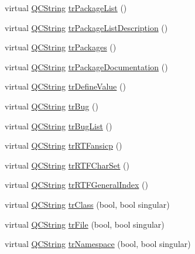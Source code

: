 \begin{DoxyCompactItemize}
\item 
virtual \mbox{\hyperlink{class_q_c_string}{Q\+C\+String}} \mbox{\hyperlink{class_translator_arabic_a265f6f48fad089ea092ab98682e0d842}{tr\+Package\+List}} ()
\item 
virtual \mbox{\hyperlink{class_q_c_string}{Q\+C\+String}} \mbox{\hyperlink{class_translator_arabic_ab1192d198f1a4bd72319034848f9bb08}{tr\+Package\+List\+Description}} ()
\item 
virtual \mbox{\hyperlink{class_q_c_string}{Q\+C\+String}} \mbox{\hyperlink{class_translator_arabic_a072aa43f25aa0fbff418fcc8a777e769}{tr\+Packages}} ()
\item 
virtual \mbox{\hyperlink{class_q_c_string}{Q\+C\+String}} \mbox{\hyperlink{class_translator_arabic_a06b71185bea0e8511121b5274d5e45be}{tr\+Package\+Documentation}} ()
\item 
virtual \mbox{\hyperlink{class_q_c_string}{Q\+C\+String}} \mbox{\hyperlink{class_translator_arabic_a69d32547d8c7f9c08fdd5414adb2af57}{tr\+Define\+Value}} ()
\item 
virtual \mbox{\hyperlink{class_q_c_string}{Q\+C\+String}} \mbox{\hyperlink{class_translator_arabic_aacd74b628e36340a3b593435bc295529}{tr\+Bug}} ()
\item 
virtual \mbox{\hyperlink{class_q_c_string}{Q\+C\+String}} \mbox{\hyperlink{class_translator_arabic_a1a0f397c655873ff36805aef2a2f4282}{tr\+Bug\+List}} ()
\item 
virtual \mbox{\hyperlink{class_q_c_string}{Q\+C\+String}} \mbox{\hyperlink{class_translator_arabic_aa85b5114f22f96945211a76b143bc067}{tr\+R\+T\+Fansicp}} ()
\item 
virtual \mbox{\hyperlink{class_q_c_string}{Q\+C\+String}} \mbox{\hyperlink{class_translator_arabic_a2d31627bc9d5ab47da2d88e210a17b32}{tr\+R\+T\+F\+Char\+Set}} ()
\item 
virtual \mbox{\hyperlink{class_q_c_string}{Q\+C\+String}} \mbox{\hyperlink{class_translator_arabic_ab7697710fd8381e9b2439afb69fb1894}{tr\+R\+T\+F\+General\+Index}} ()
\item 
virtual \mbox{\hyperlink{class_q_c_string}{Q\+C\+String}} \mbox{\hyperlink{class_translator_arabic_af60f81882a17979949235c2b0ddf0691}{tr\+Class}} (bool, bool singular)
\item 
virtual \mbox{\hyperlink{class_q_c_string}{Q\+C\+String}} \mbox{\hyperlink{class_translator_arabic_aca6144fb44b8cfcf13db8c5bc91a4557}{tr\+File}} (bool, bool singular)
\item 
virtual \mbox{\hyperlink{class_q_c_string}{Q\+C\+String}} \mbox{\hyperlink{class_translator_arabic_a1f3b25edf7d4e0bb62949b2c23bf6bbe}{tr\+Namespace}} (bool, bool singular)

\end{DoxyCompactItemize}
